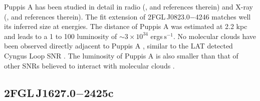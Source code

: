 \documentclass[12pt,preprint]{aastex}
\newcommand{\gev}{\text{GeV}\xspace}
\newcommand{\s}{\text{s}\xspace}
\begin{document}
Puppis A has been studied in detail in radio (\cite{puppis_a_vla}, and
references therein) and  X-ray (\cite{rosat_puppis_a,suzaku_puppis_a},
and references therein).  The fit extension of 2FGL\,J0823.0$-$4246
matches well its inferred size at \gev energies.  The distance of Puppis A was
estimated at 2.2 kpc \citep{reynoso_1995,reynoso_2003} and leads to a 1
\gev to 100 \gev luminosity of $\sim 3\times 10^{34}$ ergs$\,\s^{-1}$.
No molecular clouds have been observed directly adjacent to Puppis A
\citep{co_eastern_puppis_a}, similar to the LAT detected Cyngus Loop SNR
\citep{cygnus_loop_lat}.  The luminosity of Puppis A is also smaller
than that of other SNRs believed to interact with molecular clouds
\citep{w51c,ic443,w44,w28,w49b_lat}.


%
    
\subsection{2FGL\,J1627.0$-$2425c}
\label{section_2FGL_J1627.0-2425c}
\end{document}
